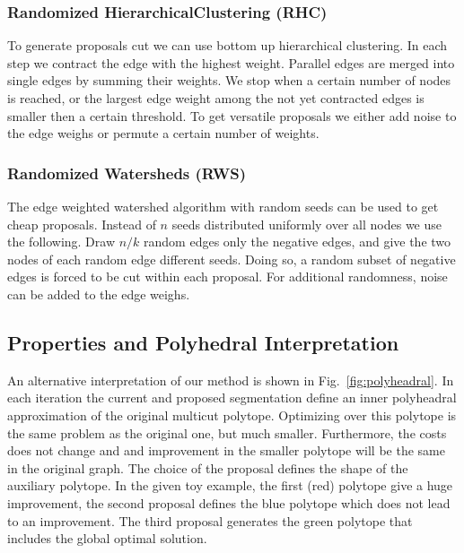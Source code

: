 \documentclass[10pt,twocolumn,letterpaper]{article}
\begin{document}
\subsubsection{Randomized HierarchicalClustering (RHC)}

To generate proposals cut we can use bottom up hierarchical clustering.
In each step we contract the edge with the highest weight.
Parallel edges are merged into single edges by summing their weights.
We stop when a certain number of nodes is reached, or the
largest edge weight among the not yet contracted edges is smaller then a certain threshold.
To get versatile proposals we either add noise 
to the edge weighs or permute a certain number of weights.


%


\subsubsection{Randomized Watersheds (RWS)}

The edge weighted watershed algorithm \cite{meyer_2013}
with random seeds can be used to get 
cheap proposals. Instead of $n$ seeds distributed uniformly
over all nodes we use the following.
Draw $n/k$ random edges only the negative edges, 
and give the two nodes of each random edge different seeds.
Doing so, a random subset of negative edges is forced
to be cut within each proposal.
For additional randomness, noise can be added to
the edge weighs.



%

\subsection{Properties and Polyhedral Interpretation}
An alternative interpretation of our method is shown in Fig.~\ref{fig:polyheadral}.
In each iteration the current and proposed segmentation define an inner polyheadral 
approximation of the original multicut polytope. 
Optimizing over this polytope is the same problem as the original one, but much smaller.
Furthermore, the costs does not change and and improvement in the smaller polytope will 
be the same in the original graph.
The choice of the proposal defines the shape of the auxiliary polytope. 
In the given toy example, the first (red) polytope give a huge improvement, the second proposal
defines the blue polytope which does not lead to an improvement. 
The third proposal generates the green polytope that includes the global optimal solution.
\end{document}
